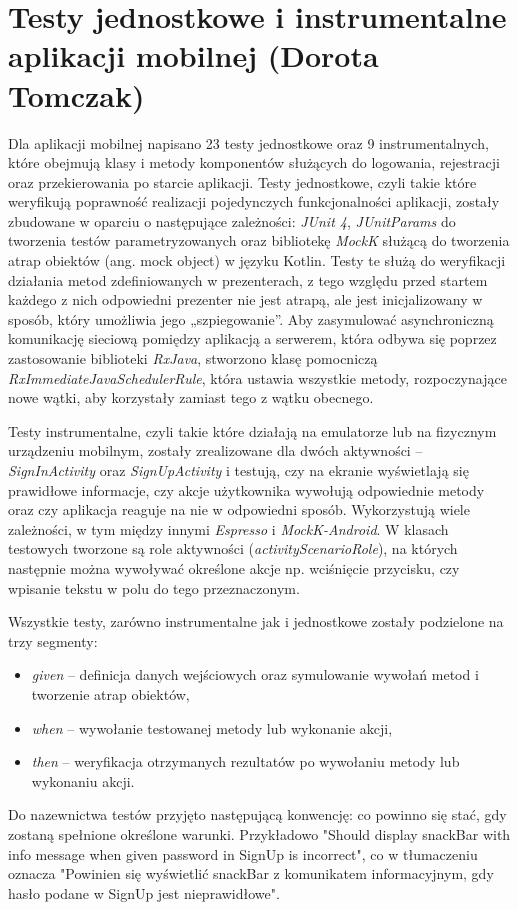 \documentclass[10pt,twoside,a4paper]{report}
\begin{document}
\section{Testy jednostkowe i instrumentalne aplikacji mobilnej (Dorota Tomczak)}
\par Dla aplikacji mobilnej napisano 23 testy jednostkowe oraz 9 instrumentalnych, które obejmują klasy i metody komponentów służących do logowania, rejestracji oraz przekierowania po starcie aplikacji. Testy jednostkowe, czyli takie które weryfikują poprawność realizacji pojedynczych funkcjonalności aplikacji, zostały zbudowane w oparciu o następujące zależności: \textit{JUnit 4}\cite{JUnit}, \textit{JUnitParams}\cite{JUnitParams} do tworzenia testów parametryzowanych oraz bibliotekę \textit{MockK}\cite{MockK} służącą do tworzenia atrap obiektów (ang. mock object) w języku Kotlin. Testy te służą do weryfikacji działania metod zdefiniowanych w prezenterach, z tego względu przed startem każdego z nich odpowiedni prezenter nie jest atrapą, ale jest inicjalizowany w sposób, który umożliwia jego „szpiegowanie”. Aby zasymulować asynchroniczną komunikację sieciową pomiędzy aplikacją a serwerem, która odbywa się poprzez zastosowanie biblioteki \textit{RxJava}\cite{RxJava}, stworzono klasę pomocniczą \textit{RxImmediateJavaSchedulerRule}, która ustawia wszystkie metody, rozpoczynające nowe wątki, aby korzystały zamiast tego z wątku obecnego.
\par Testy instrumentalne, czyli takie które działają na emulatorze lub na fizycznym urządzeniu mobilnym, zostały zrealizowane dla dwóch aktywności – \textit{SignInActivity} oraz \textit{SignUpActivity} i testują, czy na ekranie wyświetlają się prawidłowe informacje, czy akcje użytkownika wywołują odpowiednie metody oraz czy aplikacja reaguje na nie w odpowiedni sposób. Wykorzystują wiele zależności, w tym między innymi \textit{Espresso}\cite{Espresso} i \textit{MockK-Android}\cite{MockK-Android}. W klasach testowych tworzone są role aktywności (\textit{activityScenarioRole}), na których następnie można wywoływać określone akcje np. wciśnięcie przycisku, czy wpisanie tekstu w polu do tego przeznaczonym. 
\par Wszystkie testy, zarówno instrumentalne jak i jednostkowe zostały podzielone na trzy segmenty:
\begin{itemize}
\item \textit{given} -- definicja danych wejściowych oraz symulowanie wywołań metod i tworzenie atrap obiektów,
\item \textit{when} -- wywołanie testowanej metody lub wykonanie akcji,
\item \textit{then} -- weryfikacja otrzymanych rezultatów po wywołaniu metody lub wykonaniu akcji.
\end{itemize}
Do nazewnictwa testów przyjęto następującą konwencję: co powinno się stać, gdy zostaną spełnione określone warunki. Przykładowo "Should display snackBar with info message when given password in SignUp is incorrect", co w tłumaczeniu oznacza "Powinien się wyświetlić snackBar z komunikatem informacyjnym, gdy hasło podane w SignUp jest nieprawidłowe".
\end{document}

